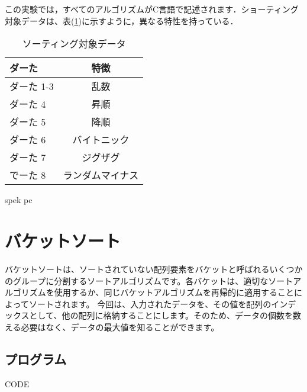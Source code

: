 \documentclass[a4j, titlepage]{jarticle}
\begin{document}
この実験では，すべてのアルゴリズムがC言語で記述されます．ショーティング対象データは、表(\ref{table_data})に示すように，異なる特性を持っている．

\begin{table}[tbh]
    \label{table_data}
    \caption{ソーティング対象データ}
    \begin{center}
        \begin{tabular}{lc}
            \hline
            ダーた & 特徴 \\ \hline\hline
            ダーた 1-3 & 乱数\\ 
            ダーた 4 &  昇順\\ 
            ダーた 5 &  降順\\ 
            ダーた 6 &  バイトニック\\ 
            ダーた 7 &  ジグザグ\\ 
            でーた 8 & ランダムマイナス\\ \hline
        \end{tabular}
    \end{center}
\end{table}

spek pc

\section{バケットソート}
バケットソートは、ソートされていない配列要素をバケットと呼ばれるいくつかのグループに分割するソートアルゴリズムです。各バケットは、適切なソートアルゴリズムを使用するか、同じバケットアルゴリズムを再帰的に適用することによってソートされます。
今回は、入力されたデータを、その値を配列のインデックスとして、他の配列に格納することにします。そのため、データの個数を数える必要はなく、データの最大値を知ることができます。

\subsection{プログラム}
CODE
\end{document}
